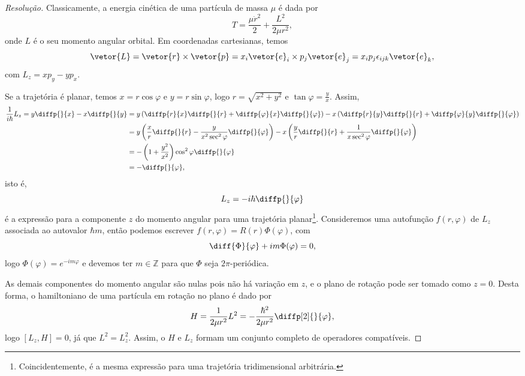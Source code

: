 \begin{proof}[Resolução]
    Classicamente, a energia cinética de uma partícula de massa \(\mu\) é dada por
    \begin{equation*}
        T = \frac{\mu \dot{r}^2}{2} + \frac{L^2}{2\mu r^2},
    \end{equation*}
    onde \(L\) é o seu momento angular orbital. Em coordenadas cartesianas, temos
    \begin{equation*}
        \vetor{L} = \vetor{r} \times \vetor{p} = x_i \vetor{e}_i \times p_j \vetor{e}_j = x_i  p_j \epsilon_{ijk}\vetor{e}_k,
    \end{equation*}
    com \(L_z = x p_y - y p_x\).

    Se a trajetória é planar, temos \(x = r\cos\varphi\) e \(y = r\sin\varphi\), logo \(r = \sqrt{x^2 + y^2}\) e \(\tan\varphi = \frac{y}{x}\). Assim,
    \begin{align*}
        \frac1{i\hbar}L_z = y \diffp{}{x} - x \diffp{}{y} &= y \left(\diffp{r}{x} \diffp{}{r} + \diffp{\varphi}{x}\diffp{}{\varphi}\right) - x \left(\diffp{r}{y} \diffp{}{r} + \diffp{\varphi}{y}\diffp{}{\varphi}\right)\\
                                                          &= y \left(\frac{x}{r}\diffp{}{r} - \frac{y}{x^2\sec^2\varphi} \diffp{}{\varphi}\right) - x \left(\frac{y}{r} \diffp{}{r} + \frac{1}{x\sec^2\varphi}\diffp{}{\varphi}\right)\\
                                                          &= -\left(1 + \frac{y^2}{x^2}\right)\cos^2\varphi \diffp{}{\varphi}\\
                                                          &= - \diffp{}{\varphi},
    \end{align*}
    isto é,
    \begin{equation*}
        L_z = -i \hbar \diffp{}{\varphi}
    \end{equation*}
    é a expressão para a componente \(z\) do momento angular para uma trajetória planar\footnote{Coincidentemente, é a mesma expressão para uma trajetória tridimensional arbitrária.}. Consideremos uma autofunção \(f(r, \varphi)\) de \(L_z\) associada ao autovalor \(\hbar m\), então podemos escrever \(f(r, \varphi) = R(r) \Phi(\varphi)\), com
    \begin{equation*}
        \diff{\Phi}{\varphi} + i m \Phi(\varphi) = 0,
    \end{equation*}
    logo \(\Phi(\varphi) = e^{-i m \varphi}\) e devemos ter \(m\in \mathbb{Z}\) para que \(\Phi\) seja \(2\pi\)-periódica.

    As demais componentes do momento angular são nulas pois não há variação em \(z\), e o plano de rotação pode ser tomado como \(z = 0\). Desta forma, o hamiltoniano de uma partícula em rotação no plano é dado por
    \begin{equation*}
        H = \frac{1}{2\mu r^2} L^2 = -\frac{\hbar^2}{2\mu r^2} \diffp[2]{}{\varphi},
    \end{equation*}
    logo \([L_z,H] = 0\), já que \(L^2 = L_z^2\). Assim, o \(H\) e \(L_z\) formam um conjunto completo de operadores compatíveis.
\end{proof}
